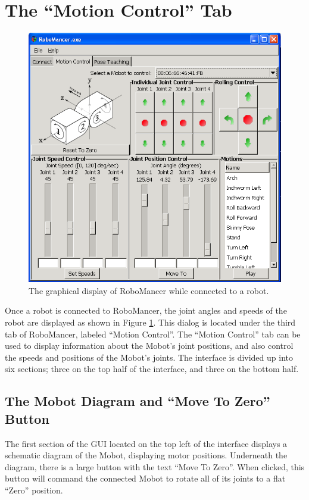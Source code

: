 \documentclass{article}
\begin{document}
\section{ The ``Motion Control'' Tab}
\begin{figure}[H]
\begin{center}
\includegraphics[width=4.5in]{images/robomancer_screenshot5.png}
\end{center}
\caption{\label{fig:shot1_populated.png} The graphical display of RoboMancer
while connected to a robot.}
\end{figure}

Once a robot is connected to RoboMancer, the joint angles and speeds
of the robot are displayed as shown in Figure \ref{fig:shot1_populated.png}.
This dialog is located under the third tab of RoboMancer, labeled 
``Motion Control''.
The ``Motion Control'' tab can be
used to display
information about the Mobot's joint positions, and also control the
speeds and positions of the Mobot's joints. The interface is divided
up into six sections; three on the top half of the interface, and three on 
the bottom half. 

\subsection{The Mobot Diagram and ``Move To Zero'' Button}
The first section of the GUI located on the top left of the interface
displays a schematic diagram of the Mobot, displaying motor positions.
Underneath the diagram, there is a large button with the text 
``Move To Zero''. When clicked, this button will command the connected
Mobot to rotate all of its joints to a flat ``Zero'' position.
\end{document}
